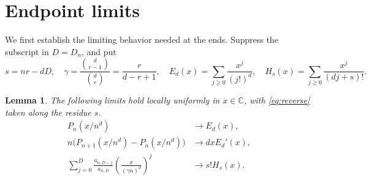 \documentclass[11pt]{article}
\newtheorem{lemma}{Lemma}
\begin{document}
\section{Endpoint limits}

We first establish the limiting behavior needed at the ends.
Suppress the subscript in \(D=D_n\), and put
\[
s=nr-dD,\quad
\gamma=\frac{\binom d{r-1}}{\binom dr}=\frac{r}{d-r+1},\quad
E_d(x)=\sum_{j\ge0}\frac{x^j}{(j!)^d},\quad
H_s(x)=\sum_{j\ge0}\frac{x^j}{(dj+s)!}.
\]

\begin{lemma}\label{lem:limits}
The following limits hold locally uniformly in \(x\in\mathbb C\),
with \eqref{eq:reverse} taken along the residue \(s\).
\begin{align}
P_n(x/n^d)&\longrightarrow E_d(x),\label{eq:forward}\\
n\big(P_{n+1}(x/n^d)-P_n(x/n^d)\big)&\longrightarrow d x E_d'(x),
\label{eq:difference}\\
\sum_{j=0}^{D}\frac{a_{n,D-j}}{a_{n,D}}
      \left(\frac{x}{(\gamma n)^d}\right)^j&\longrightarrow s!H_s(x).
\label{eq:reverse}
\end{align}
\end{lemma}
\end{document}
